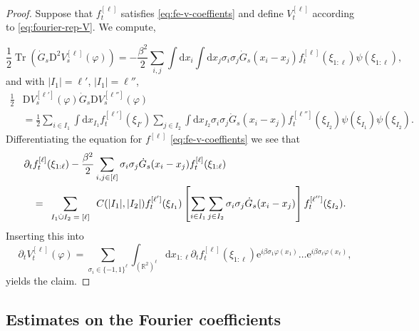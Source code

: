 \documentclass[11pt, a4paper]{scrartcl}
\numberwithin{equation}{section}
\theoremstyle{plain}
\theoremstyle{remark}
\newcommand{\mathD}{\mathrm{D}}
\newcommand{\mathd}{\mathrm{d}}
\newcommand{\mathe}{\mathrm{e}}
\newcommand{\tmop}[1]{\ensuremath{\operatorname{#1}}}
\newcommand{\tmscript}[1]{\text{\scriptsize{$#1$}}}
\begin{document}
\begin{proof}
  Suppose that $f_t^{[\ell]}$ satisfies \eqref{eq:fe-v-coeffients} and define
  $V^{[\ell]}_t$ according to \eqref{eq:fourier-rep-V}. We compute,
  
  
  \[ \frac{1}{2} \tmop{Tr} (\dot{G}_s \mathD^2 V^{[\ell]}_s (\varphi)) = -
     \frac{\beta^2}{2}  \sum_{i, j} \int \mathd x_i \int \mathd x_j \sigma_i
     \sigma_j \dot{G}_s (x_i - x_j) f_t^{[\ell]} (\xi_{1 : \ell}) \psi (\xi_{1
     : \ell}), \]
  and with $|I_1| = \ell'$, $|I_1| = \ell''$,
  \[ \begin{aligned}
    \frac{1}{2}& \mathD V_s^{[\ell']} (\varphi) \dot{G}_s \mathD
       V_s^{[\ell'']} (\varphi) \\
      & = \frac{1}{2} \sum_{i \in I_1} \int \mathd
       x_{I_1} f_t^{[\ell']} (\xi_{I'}) \sum_{j \in I_2} \int \mathd x_{I_2}
       \sigma_i \sigma_j\dot{G}_s (x_i - x_j) f_t^{[\ell'']} (\xi_{I_2}) \psi (\xi_{I_1}) \psi
       (\xi_{I_2}) .
  \end{aligned} \]
  Differentiating the equation for $f^{[\ell]}$ \eqref{eq:fe-v-coeffients} we see that
  \[ \begin{aligned}
       \partial_t& f_t^{[\ell]} (\xi_{1 : \ell}) - \frac{\beta^2}{2}  \sum_{i,
       j \in [\ell]} \sigma_i \sigma_j \dot{G}_s (x_i - x_j) f_t^{[\ell]}
       (\xi_{1 : \ell})\\
      & = \sum_{\tmscript{\begin{array}{c}
         I_1 \dot{\cup} I_2 = [\ell]\\
       \end{array}}} C (| I_1 |, | I_2 |) f_t^{[\ell']} (\xi_{I_1})
        \left[ \sum_{i \in I_1} \sum_{j \in I_2}
       \sigma_i \sigma_j  \dot{G}_s (x_i - x_j) \right] f_t^{[\ell'']} (\xi_{I_2}).
     \end{aligned}
  \]
  Inserting this into
  \[ \partial_t V_t^{[\ell]} (\varphi) = \sum_{\sigma_i \in \{ - 1, 1
     \}^{\ell}} \int_{(\mathbb{R}^2)^{\ell}} \mathd x_{1 : \ell} \partial_t
     f_t^{[\ell]} (\xi_{1 : \ell}) \mathe^{i \beta \sigma_1 \varphi (x_1)}
     \ldots \mathe^{i \beta \sigma_{\ell} \varphi (x_{\ell})}, \]
  yields the claim.
\end{proof}

\subsection{Estimates on the Fourier
coefficients}\label{sec:flow-coefficients}
\end{document}
